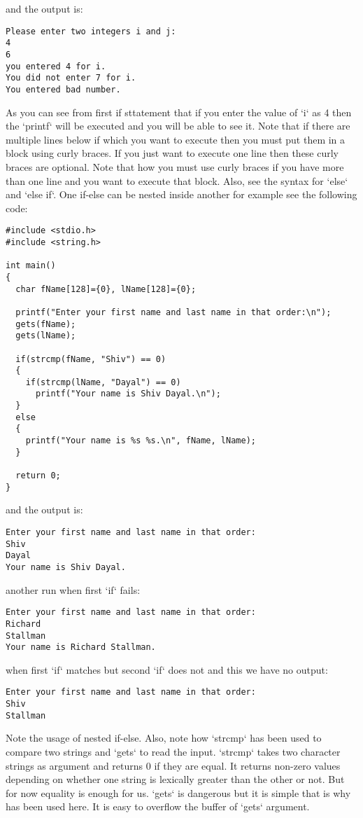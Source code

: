 and the output is:

\begin{Verbatim}[frame=single]
Please enter two integers i and j:
4
6
you entered 4 for i.
You did not enter 7 for i.
You entered bad number.
\end{Verbatim}

As you can see from first if sttatement that if you enter the value of `i` as 4
then the `printf` will be executed and you will be able to see it. Note that if
there are multiple lines below if which you want to execute then you must put
them in a block using curly braces. If you just want to execute one line then
these curly braces are optional. Note that how you must use curly braces if you
have more than one line and you want to execute that block. Also, see the
syntax for `else` and `else if`. One if-else can be nested inside
another for example see the following code:

\begin{Verbatim}[frame=single]
#include <stdio.h>
#include <string.h>
 
int main()
{
  char fName[128]={0}, lName[128]={0};
 
  printf("Enter your first name and last name in that order:\n");
  gets(fName);
  gets(lName);
 
  if(strcmp(fName, "Shiv") == 0)
  {
    if(strcmp(lName, "Dayal") == 0)
      printf("Your name is Shiv Dayal.\n");
  }
  else
  {
    printf("Your name is %s %s.\n", fName, lName);
  }
 
  return 0;
}
\end{Verbatim}

and the output is:

\begin{Verbatim}[frame=single]
Enter your first name and last name in that order:
Shiv
Dayal
Your name is Shiv Dayal.
\end{Verbatim}

another run when first `if` fails:

\begin{Verbatim}[frame=single]
Enter your first name and last name in that order:
Richard
Stallman
Your name is Richard Stallman.
\end{Verbatim}

when first `if` matches but second `if` does not and this we have no output:

\begin{Verbatim}[frame=single]
Enter your first name and last name in that order:
Shiv
Stallman
\end{Verbatim}

Note the usage of nested if-else. Also, note how `strcmp` has been used to
compare two strings and `gets` to read the input. `strcmp` takes two character
strings as argument and returns 0 if they are equal. It returns non-zero values
depending on whether one string is lexically greater than the other or not. But
for now equality is enough for us. `gets` is dangerous but it is simple that is
why has been used here. It is easy to overflow the buffer of `gets` argument.
